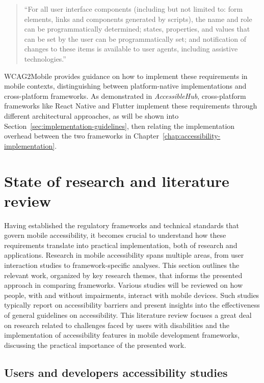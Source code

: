 \begin{quote}
``For all user interface components (including but not limited to: form elements, links and components generated by scripts), the name and role can be programmatically determined; states, properties, and values that can be set by the user can be programmatically set; and notification of changes to these items is available to user agents, including assistive technologies.''
\end{quote}

WCAG2Mobile provides guidance on how to implement these requirements in mobile contexts, distinguishing between platform-native implementations and cross-platform frameworks. As demonstrated in \textit{AccessibleHub}, cross-platform frameworks like React Native and Flutter implement these requirements through different architectural approaches, as will be shown into Section~\ref{sec:implementation-guidelines}, then relating the implementation overhead between the two frameworks in Chapter~\ref{chap:accessibility-implementation}.

\section{State of research and literature review}
\label{chap:accessibility-literature}

Having established the regulatory frameworks and technical standards that govern mobile accessibility, it becomes crucial to understand how these requirements translate into practical implementation, both of research and applications. 
Research in mobile accessibility spans multiple areas, from user interaction studies to framework-specific analyses. This section outlines the relevant work, organized by key research themes, that informs the presented approach in comparing frameworks. Various studies will be reviewed on how people, with and without impairments, interact with mobile devices. Such studies typically report on accessibility barriers and present insights into the effectiveness of general guidelines on accessibility. This literature review focuses a great deal on research related to challenges faced by users with disabilities and the implementation of accessibility features in mobile development frameworks, discussing the practical importance of the presented work.

\subsection{Users and developers accessibility studies}

